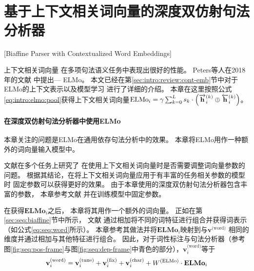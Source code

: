 
\section{基于上下文相关词向量的深度双仿射句法分析器}[Biaffine Parser with Contextualized Word Embeddings]

上下文相关词向量\cite{NIPS2017_7209,peters-EtAl:2018:N18-1,P18-1031,gpt1,DBLP:journals/corr/abs-1810-04805}
在多项句法语义任务中表现出很好的性能。
Peters等人在2018年的文献\cite{peters-EtAl:2018:N18-1}
中提出\elmochinesetranslation --- ELMo。
本文已经在第\ref{sec:intro:review:cont-emb}节中对于ELMo的上下文表示以及模型学习
进行了详细的介绍。
本章在这里按照公式\ref{eq:intro:elmo:pool}获得上下文相关词向量$\text{ELMo}_i = \gamma \sum_{k=0}^L s_k \cdot \left(\overrightarrow{\mathbf{h}}_i^{(k)} \oplus \overleftarrow{\mathbf{h}}_i^{(k)}\right)$。

\paragraph{在深度双仿射句法分析器中使用ELMo}
本章关注的问题是ELMo在通用依存句法分析中的效果。
本章将ELMo用作一种额外的词向量输入模型中。

文献在多个任务上研究了
在使用上下文相关词向量时是否需要调整词向量参数的问题。
根据其结论，在将上下文相关词向量应用于有丰富的任务相关参数的模型时
固定参数可以获得更好的效果。
由于本章使用的深度双仿射句法分析器包含丰富的参数，
本章参考文献
并在训练模型中固定参数。

在获得$\mathbf{ELMo}_i$之后，
本章将其用作一个额外的词向量。
正如在第\ref{sec:seq:biaffine}节中所示，
文献
通过相加将不同的词特征进行组合并获得词表示（如公式\ref{eq:seq:word}所示）。
本章参考其做法并将$\mathbf{ELMo}_i$映射到与$\mathbf{v}^{\text{(word)}}$
相同的维度并通过相加与其他特征进行组合。
因此，对于词性标注与句法分析器（参考图\ref{fig:seq:pos-frame}与图\ref{fig:seq:dep-frame}中青色的部分），$\mathbf{v}_i^{\text{(word)}}$等于
\begin{equation}\label{eq:seq:final_word_rep}
\mathbf{v}_i^{\text{(word)}} = \mathbf{v}^{\text{(tune)}}_i  + \mathbf{v}^{\text{(fix)}}_i + \mathbf{v}^{\text{(char)}}_i + W^{\text{(ELMo)}} \cdot \mathbf{ELMo}_i
\end{equation}

